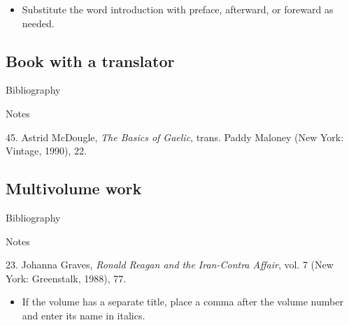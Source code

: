 \begin{itemize}\item Substitute the word introduction with preface, afterward,
or foreward as needed.\end{itemize}

\subsection{Book with a translator}

\begin{center}{Bibliography}\end{center} 

\begin{singlespace}
\noindent{}
\end{singlespace}

\begin{center}{Notes}\end{center} 

\begin{singlespace}
\noindent\hspace{1.2cm}45. Astrid McDougle,
\emph{The Basics of Gaelic}, trans. Paddy Maloney (New York: Vintage, 1990), 22.
\end{singlespace}


\subsection{Multivolume work}

\begin{center}{Bibliography}\end{center} 

\begin{singlespace}
\noindent{}
\end{singlespace}


\begin{center}{Notes}\end{center} 
\begin{singlespace}
\noindent\hspace{1.2cm}23. Johanna Graves,
\emph{Ronald Reagan and the Iran-Contra Affair}, vol. 7 (New York: Greenstalk,
1988), 77.
\end{singlespace}


\begin{itemize}\item If the volume has a separate title, place a comma after the
volume number and enter its name in italics.\end{itemize}

